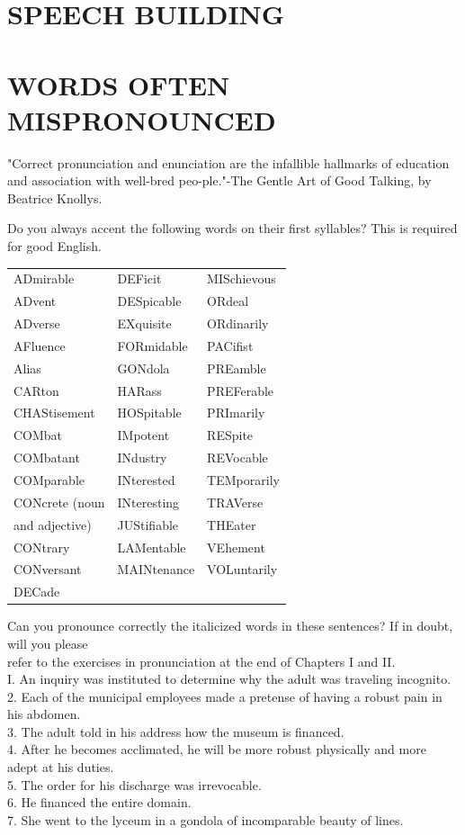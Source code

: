 \documentclass[10pt]{article}
\begin{document}
\section*{SPEECH BUILDING}
\section*{WORDS OFTEN MISPRONOUNCED}
"Correct pronunciation and enunciation are the infallible hallmarks of education and association with well-bred peo-ple."-The Gentle Art of Good Talking, by Beatrice Knollys.

Do you always accent the following words on their first syllables? This is required for good English.

\begin{center}
\begin{tabular}{lll}
ADmirable & DEFicit & MISchievous \\
ADvent & DESpicable & ORdeal \\
ADverse & EXquisite & ORdinarily \\
AFluence & FORmidable & PACifist \\
Alias & GONdola & PREamble \\
CARton & HARass & PREFerable \\
CHAStisement & HOSpitable & PRImarily \\
COMbat & IMpotent & RESpite \\
COMbatant & INdustry & REVocable \\
COMparable & INterested & TEMporarily \\
CONcrete (noun & INteresting & TRAVerse \\
and adjective) & JUStifiable & THEater \\
CONtrary & LAMentable & VEhement \\
CONversant & MAINtenance & VOLuntarily \\
DECade &  &  \\
\end{tabular}
\end{center}

Can you pronounce correctly the italicized words in these sentences? If in doubt, will you please\\
refer to the exercises in pronunciation at the end of Chapters I and II.\\
I. An inquiry was instituted to determine why the adult was traveling incognito.\\
2. Each of the municipal employees made a pretense of having a robust pain in his abdomen.\\
3. The adult told in his address how the museum is financed.\\
4. After he becomes acclimated, he will be more robust physically and more adept at his duties.\\
5. The order for his discharge was irrevocable.\\
6. He financed the entire domain.\\
7. She went to the lyceum in a gondola of incomparable beauty of lines.
\end{document}

